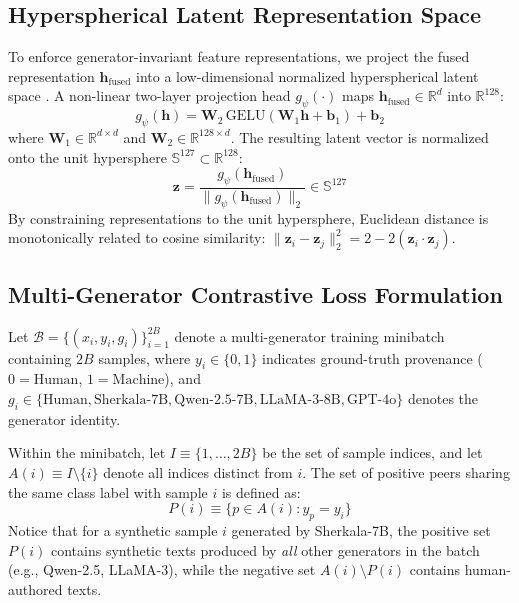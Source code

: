 \subsection{Hyperspherical Latent Representation Space}
To enforce generator-invariant feature representations, we project the fused representation $\mathbf{h}_{\text{fused}}$ into a low-dimensional normalized hyperspherical latent space \citep{khosla2020supervised}. A non-linear two-layer projection head $g_\psi(\cdot)$ maps $\mathbf{h}_{\text{fused}} \in \mathbb{R}^d$ into $\mathbb{R}^{128}$:
\begin{equation}
    \label{eq:projection_head}
    g_\psi(\mathbf{h}) = \mathbf{W}_2 \, \mathrm{GELU}(\mathbf{W}_1 \mathbf{h} + \mathbf{b}_1) + \mathbf{b}_2
\end{equation}
where $\mathbf{W}_1 \in \mathbb{R}^{d \times d}$ and $\mathbf{W}_2 \in \mathbb{R}^{128 \times d}$. The resulting latent vector is normalized onto the unit hypersphere $\mathbb{S}^{127} \subset \mathbb{R}^{128}$:
\begin{equation}
    \label{eq:hypersphere_norm}
    \mathbf{z} = \frac{g_\psi(\mathbf{h}_{\text{fused}})}{\|g_\psi(\mathbf{h}_{\text{fused}})\|_2} \in \mathbb{S}^{127}
\end{equation}
By constraining representations to the unit hypersphere, Euclidean distance is monotonically related to cosine similarity: $\|\mathbf{z}_i - \mathbf{z}_j\|_2^2 = 2 - 2 (\mathbf{z}_i \cdot \mathbf{z}_j)$.

\subsection{Multi-Generator Contrastive Loss Formulation}
Let $\mathcal{B} = \{(x_i, y_i, g_i)\}_{i=1}^{2B}$ denote a multi-generator training minibatch containing $2B$ samples, where $y_i \in \{0, 1\}$ indicates ground-truth provenance ($0 = \text{Human}$, $1 = \text{Machine}$), and $g_i \in \{\text{Human}, \text{Sherkala-7B}, \text{Qwen-2.5-7B}, \text{LLaMA-3-8B}, \text{GPT-4o}\}$ denotes the generator identity.

Within the minibatch, let $I \equiv \{1, \dots, 2B\}$ be the set of sample indices, and let $A(i) \equiv I \setminus \{i\}$ denote all indices distinct from $i$. The set of positive peers sharing the same class label with sample $i$ is defined as:
\begin{equation}
    P(i) \equiv \{p \in A(i) : y_p = y_i\}
\end{equation}
Notice that for a synthetic sample $i$ generated by Sherkala-7B, the positive set $P(i)$ contains synthetic texts produced by \textit{all} other generators in the batch (e.g., Qwen-2.5, LLaMA-3), while the negative set $A(i) \setminus P(i)$ contains human-authored texts.

